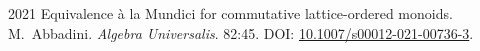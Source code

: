 \pubrow
  {2021}
  {Equivalence à la Mundici for commutative lattice-ordered monoids.}
  {M.\ Abbadini.}
  {\emph{Algebra Universalis}. 82:45. DOI: \href{https://doi.org/10.1007/s00012-021-00736-3}{10.1007/s00012-021-00736-3}.}


